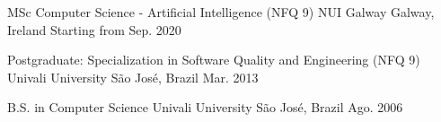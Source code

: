 

\begin{cventries}

  \cventry
    {MSc Computer Science - Artificial Intelligence (NFQ 9)} %
    {NUI Galway} %
    {Galway, Ireland} %
    {Starting from Sep. 2020} %
    {}

  \cventry
    {Postgraduate: Specialization in Software Quality and Engineering (NFQ 9)} %
    {Univali University} %
    {São José, Brazil} %
    {Mar. 2013} %
    {}

  \cventry
    {B.S. in Computer Science} %
    {Univali University} %
    {São José, Brazil} %
    {Ago. 2006} %
    {}

\end{cventries}
